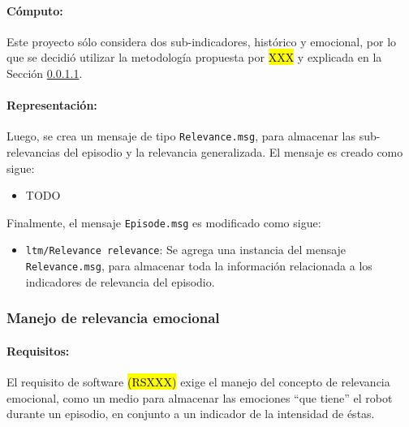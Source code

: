 \paragraph{Cómputo:}
Este proyecto sólo considera dos sub-indicadores, histórico y emocional, por lo que se decidió utilizar la metodología propuesta por \hl{XXX} \cite{} y explicada en la Sección \ref{}.


\paragraph{Representación:}
Luego, se crea un mensaje de tipo \texttt{Relevance.msg}, para almacenar las sub-relevancias del episodio y la relevancia generalizada. El mensaje es creado como sigue:
\begin{itemize}
\item TODO
\end{itemize}

Finalmente, el mensaje \texttt{Episode.msg} es modificado como sigue:
\begin{itemize}
	\item \texttt{ltm/Relevance relevance}: Se agrega una instancia del mensaje \texttt{Relevance.msg}, para almacenar toda la información relacionada a los indicadores de relevancia del episodio.
\end{itemize}


\subsubsection{Manejo de relevancia emocional}

\paragraph{Requisitos:}
El requisito de software \hl{(RSXXX)} exige el manejo del concepto de relevancia emocional, como un medio para almacenar las emociones ``que tiene'' el robot durante un episodio, en conjunto a un indicador de la intensidad de éstas.


